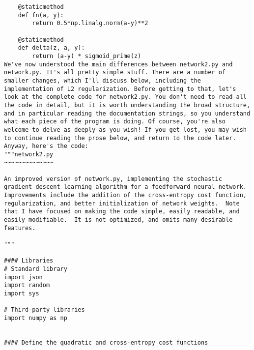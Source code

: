\begin{lstlisting}
    @staticmethod
    def fn(a, y):
        return 0.5*np.linalg.norm(a-y)**2

    @staticmethod
    def delta(z, a, y):
        return (a-y) * sigmoid_prime(z)
We've now understood the main differences between network2.py and network.py. It's all pretty simple stuff. There are a number of smaller changes, which I'll discuss below, including the implementation of L2 regularization. Before getting to that, let's look at the complete code for network2.py. You don't need to read all the code in detail, but it is worth understanding the broad structure, and in particular reading the documentation strings, so you understand what each piece of the program is doing. Of course, you're also welcome to delve as deeply as you wish! If you get lost, you may wish to continue reading the prose below, and return to the code later. Anyway, here's the code:
"""network2.py
~~~~~~~~~~~~~~

An improved version of network.py, implementing the stochastic
gradient descent learning algorithm for a feedforward neural network.
Improvements include the addition of the cross-entropy cost function,
regularization, and better initialization of network weights.  Note
that I have focused on making the code simple, easily readable, and
easily modifiable.  It is not optimized, and omits many desirable
features.

"""

#### Libraries
# Standard library
import json
import random
import sys

# Third-party libraries
import numpy as np


#### Define the quadratic and cross-entropy cost functions

class QuadraticCost(object):

    @staticmethod
    def fn(a, y):
        """Return the cost associated with an output ''a`` and desired output
        ``y``.

        """
        return 0.5*np.linalg.norm(a-y)**2

    @staticmethod
    def delta(z, a, y):
        """Return the error delta from the output layer."""
        return (a-y) * sigmoid_prime(z)


class CrossEntropyCost(object):

    @staticmethod
    def fn(a, y):
        """Return the cost associated with an output ``a`` and desired output
        ``y``.  Note that np.nan_to_num is used to ensure numerical
        stability.  In particular, if both ``a`` and ``y`` have a 1.0
        in the same slot, then the expression (1-y)*np.log(1-a)
        returns nan.  The np.nan_to_num ensures that that is converted
        to the correct value (0.0).


\end{lstlisting}
